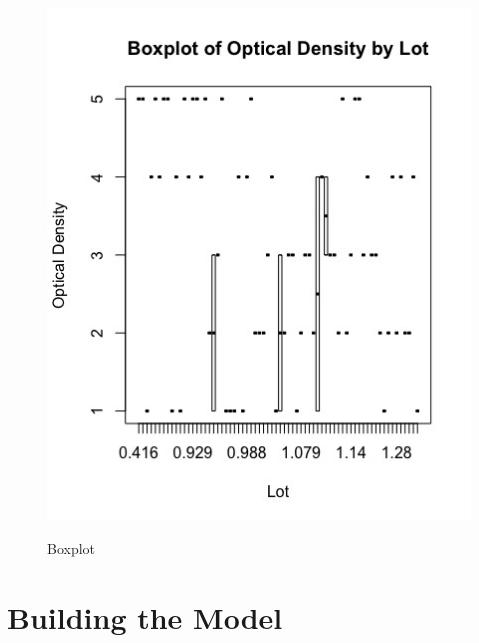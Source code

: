 \begin{figure}[H] %
        \centering
        \caption{Boxplot}
        \includegraphics[scale=0.5]{pictures/BoxPlotOpticalDensity.jpg} 
        \label{fig:BoxPlotOpticalDensity}
\end{figure}

 

\section{Building the Model}

